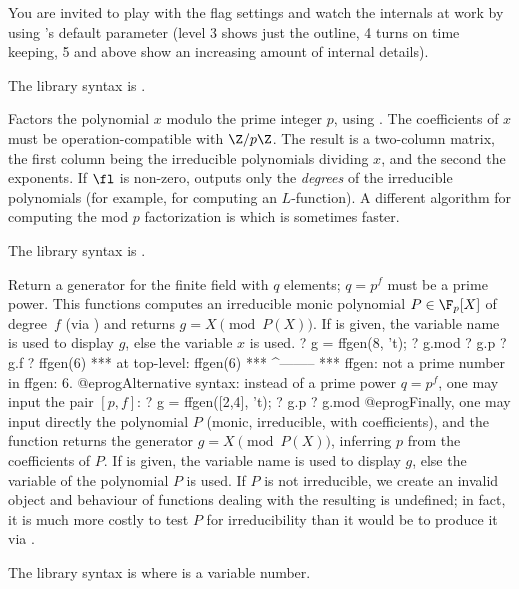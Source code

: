 You are invited to play with the flag settings and watch the internals at
work by using 's  default parameter (level 3 shows
just the outline, 4 turns on time keeping, 5 and above show an increasing
amount of internal details).

The library syntax is .

\label{se:factormod}
Factors the polynomial $x$ modulo the prime integer $p$, using
. The coefficients of $x$ must be operation-compatible with
$\Z/p\Z$. The result is a two-column matrix, the first column being the
irreducible polynomials dividing $x$, and the second the exponents. If $\fl$
is non-zero, outputs only the \emph{degrees} of the irreducible polynomials
(for example, for computing an $L$-function). A different algorithm for
computing the mod $p$ factorization is  which is sometimes
faster.

The library syntax is .

\label{se:ffgen}
Return a  generator for the finite field with $q$ elements;
$q = p^f$ must be a prime power. This functions computes an irreducible
monic polynomial $P\in\F_p[X]$ of degree~$f$ (via ) and
returns $g = X \pmod{P(X)}$. If  is given, the variable name is used
to display $g$, else the variable $x$ is used.
\bprog
? g = ffgen(8, 't);
? g.mod
? g.p
? g.f
? ffgen(6)
 ***   at top-level: ffgen(6)
 ***                 ^--------
 *** ffgen: not a prime number in ffgen: 6.
@eprog\noindent Alternative syntax: instead of a prime power $q=p^f$, one may
input the pair $[p,f]$:
\bprog
? g = ffgen([2,4], 't);
? g.p
? g.mod
@eprog\noindent Finally, one may input
directly the polynomial $P$ (monic, irreducible, with 
coefficients), and the function returns the generator $g = X \pmod{P(X)}$,
inferring $p$ from the coefficients of $P$. If  is given, the
variable name is used to display $g$, else the variable of the polynomial
$P$ is used. If $P$ is not irreducible, we create an invalid object and
behaviour of functions dealing with the resulting 
is undefined; in fact, it is much more costly to test $P$ for
irreducibility than it would be to produce it via .

The library syntax is  where  is a variable number.

